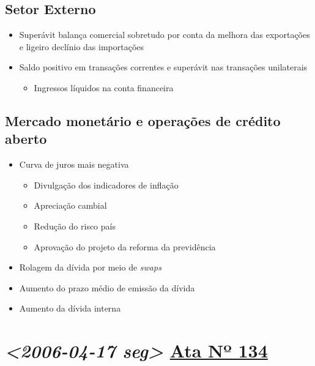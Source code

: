 \documentclass[11pt]{article}
\begin{document}
\subsection*{Setor Externo}
\label{sec:orga935421}
\begin{itemize}
\item Superávit balança comercial sobretudo por conta da melhora das exportações e ligeiro declínio das importações
\item Saldo positivo em transações correntes e superávit nas transações unilaterais
\begin{itemize}
\item Ingressos líquidos na conta financeira
\end{itemize}
\end{itemize}
\subsection*{Mercado monetário e operações de crédito aberto}
\label{sec:org239717d}
\begin{itemize}
\item Curva de juros mais negativa
\begin{itemize}
\item Divulgação dos indicadores de inflação
\item Apreciação cambial
\item Redução do risco país
\item Aprovação do projeto da reforma da previdência
\end{itemize}
\item Rolagem da dívida por meio de \emph{swaps}
\item Aumento do prazo médio de emissão da dívida
\item Aumento da dívida interna
\end{itemize}

\section*{\textit{<2006-04-17 seg> } \href{https://www.bcb.gov.br/publicacoes/atascopom/24042008}{Ata Nº 134}}
\label{sec:org80409ab}
\end{document}
